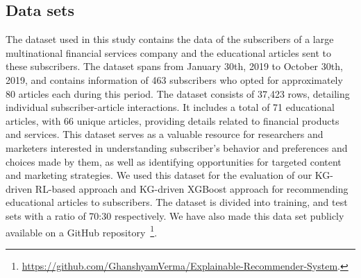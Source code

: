 \documentclass[11pt]{article}
\begin{document}
\subsection{Data sets}

The dataset used in this study contains the data of the subscribers of a large multinational financial services company and the educational articles sent to these subscribers. The dataset spans from January 30th, 2019 to October 30th, 2019, and contains information of 463 subscribers who opted for approximately 80 articles each during this period.
The dataset consists of 37,423 rows, detailing individual subscriber-article interactions. It includes a total of 71 educational articles, with 66 unique articles, providing details related to financial products and services. This dataset serves as a valuable resource for researchers and marketers interested in understanding subscriber's behavior and preferences and choices made by them, as well as identifying opportunities for targeted content and marketing strategies. We used this dataset for the evaluation of our KG-driven RL-based approach and KG-driven XGBoost approach for recommending educational articles to subscribers. The dataset is divided into training, and test sets with a ratio of 70:30 respectively. We have also made this data set publicly available on a GitHub repository~\footnote{\url{https://github.com/GhanshyamVerma/Explainable-Recommender-System}.}.
\end{document}
